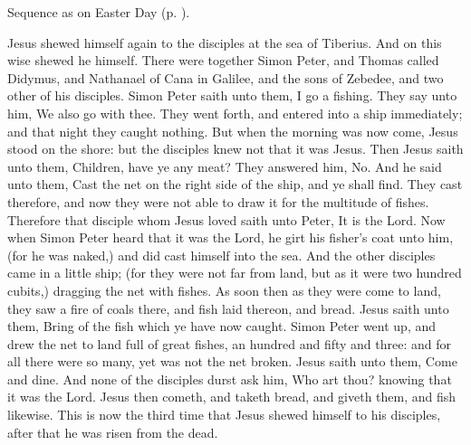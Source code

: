 
\begin{rubric}
    Sequence as on Easter Day (p. \pageref{PaschalSequence}).
\end{rubric}

 Jesus shewed himself again to the disciples at the sea of Tiberius. And on this wise shewed he himself. There were together Simon Peter, and Thomas called Didymus, and Nathanael of Cana in Galilee, and the sons of Zebedee, and two other of his disciples. Simon Peter saith unto them, I go a fishing. They say unto him, We also go with thee. They went forth, and entered into a ship immediately; and that night they caught nothing. But when the morning was now come, Jesus stood on the shore: but the disciples knew not that it was Jesus. Then Jesus saith unto them, Children, have ye any meat? They answered him, No. And he said unto them, Cast the net on the right side of the ship, and ye shall find. They cast therefore, and now they were not able to draw it for the multitude of fishes. Therefore that disciple whom Jesus loved saith unto Peter, It is the Lord. Now when Simon Peter heard that it was the Lord, he girt his fisher's coat unto him, (for he was naked,) and did cast himself into the sea. And the other disciples came in a little ship; (for they were not far from land, but as it were two hundred cubits,) dragging the net with fishes. As soon then as they were come to land, they saw a fire of coals there, and fish laid thereon, and bread. Jesus saith unto them, Bring of the fish which ye have now caught. Simon Peter went up, and drew the net to land full of great fishes, an hundred and fifty and three: and for all there were so many, yet was not the net broken. Jesus saith unto them, Come and dine. And none of the disciples durst ask him, Who art thou? knowing that it was the Lord. Jesus then cometh, and taketh bread, and giveth them, and fish likewise. This is now the third time that Jesus shewed himself to his disciples, after that he was risen from the dead.



